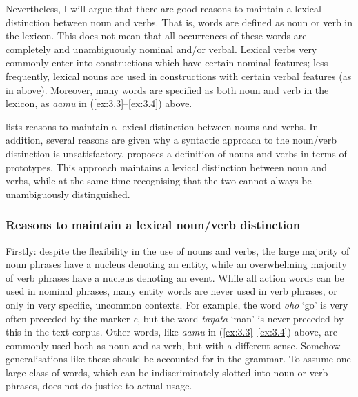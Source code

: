Nevertheless, I will argue that there are good reasons to maintain a lexical distinction between noun and verbs. That is, words are defined as noun or verb in the lexicon. This does not mean that all occurrences of these words are completely and unambiguously nominal and/or verbal. Lexical verbs very commonly enter into constructions which have certain nominal features; less frequently, lexical nouns are used in constructions with certain verbal features (as in  above). Moreover, many words are specified as both noun and verb in the lexicon, as \textit{\mbox{{\ꞌ}a{\ꞌ}amu}} in (\ref{ex:3.3}–\ref{ex:3.4}) above.

 lists reasons to maintain a lexical distinction between nouns and verbs. In addition, several reasons are given why a syntactic approach to the noun/verb distinction is unsatisfactory.  proposes a definition of nouns and verbs in terms of prototypes. This approach maintains a lexical distinction between noun and verbs, while at the same time recognising that the two cannot always be unambiguously distinguished.

\subsubsection[Reasons to maintain a lexical noun/verb distinction]{Reasons to maintain a lexical noun/verb distinction}\label{sec:3.2.1.1}

Firstly: despite the flexibility in the use of nouns and verbs, the large majority of noun phrases have a nucleus denoting an entity, while an overwhelming majority of verb phrases have a nucleus denoting an event. While all action words can be used in nominal phrases, many entity words are never used in verb phrases, or only in very specific, uncommon contexts. For example, the word \textit{oho} ‘go’ is very often preceded by the  marker \textit{e}, but the word \textit{taŋata} ‘man’ is never preceded by this  in the text corpus. Other words, like \textit{\mbox{{\ꞌ}a{\ꞌ}amu}} in (\ref{ex:3.3}–\ref{ex:3.4}) above, are commonly used both as noun and as verb, but with a different sense. Somehow generalisations like these should be accounted for in the grammar. To assume one large class of words, which can be indiscriminately slotted into noun or verb phrases, does not do justice to actual usage.

